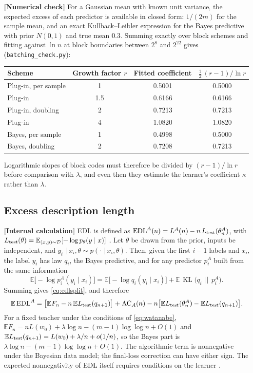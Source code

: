 \documentclass[11pt,a4paper]{article}
\newcommand{\E}{\mathbb E}
\newcommand{\KL}{\operatorname{KL}}
\newcommand{\EDL}{\mathrm{EDL}}
\newcommand{\evl}[2]{{\small\bfseries\color{#1}[#2]}}
\newcommand{\LCalc}{\evl{ccalc}{Internal calculation}}
\newcommand{\LNum}{\evl{cnum}{Numerical check}}
\begin{document}
\LNum{} For a Gaussian mean with known unit variance, the expected excess
of each predictor is available in closed form: $1/(2m)$ for the sample
mean, and an exact Kullback--Leibler expression for the Bayes predictive
with prior $N(0,1)$ and true mean $0.3$. Summing exactly over block
schemes and fitting against $\ln n$ at block boundaries between $2^8$ and
$2^{22}$ gives (\texttt{batching\_check.py}):

\begin{center}
\begin{tabular}{@{}lccc@{}}
\toprule
Scheme & Growth factor $r$ & Fitted coefficient & $\tfrac12\,(r-1)/\ln r$ \\
\midrule
Plug-in, per sample & 1 & 0.5001 & 0.5000 \\
Plug-in & 1.5 & 0.6166 & 0.6166 \\
Plug-in, doubling & 2 & 0.7213 & 0.7213 \\
Plug-in & 4 & 1.0820 & 1.0820 \\
Bayes, per sample & 1 & 0.4998 & 0.5000 \\
Bayes, doubling & 2 & 0.7208 & 0.7213 \\
\bottomrule
\end{tabular}
\end{center}

\noindent Logarithmic slopes of block codes must therefore be divided by
$(r-1)/\ln r$ before comparison with $\lambda$, and even then they estimate
the learner's coefficient $\kappa$ rather than $\lambda$.

\subsection{Excess description length}
\label{app:edl}

\LCalc{} EDL is defined as $\EDL^A(n)=L^A(n)-n\,L_{\rm test}(\theta^A_n)$,
with $L_{\rm test}(\theta)=\E_{(x,y)\sim\mathcal D}[-\log p_\theta(y\mid x)]$
\cite{donoway2026}. Let $\theta$ be drawn from the prior, inputs be
independent, and $y_i\mid x_i,\theta\sim p(\cdot\mid x_i,\theta)$. Then, given
the first $i-1$ labels and $x_i$, the label $y_i$ has law $q_i$, the Bayes
predictive, and for any predictor $p^A_i$ built from the same information
\begin{equation}
\E\bigl[-\log p^A_i(y_i\mid x_i)\bigr]
=\E\bigl[-\log q_i(y_i\mid x_i)\bigr]+\E\,\KL\bigl(q_i\,\|\,p^A_i\bigr).
\end{equation}
Summing gives \eqref{eq:edlsplit}, and therefore
\[
\E\,\EDL^A=\bigl[\E F_n-n\,\E L_{\rm test}(q_{n+1})\bigr]
+\mathrm{AC}_A(n)-n\bigl[\E L_{\rm test}(\theta^A_n)-\E L_{\rm test}(q_{n+1})\bigr].
\]
For a fixed teacher under the conditions of \eqref{eq:watanabe},
$\E F_n=nL(w_0)+\lambda\log n-(m-1)\log\log n+O(1)$ and
$\E L_{\rm test}(q_{n+1})=L(w_0)+\lambda/n+o(1/n)$, so the Bayes part is
$\lambda\log n-(m-1)\log\log n+O(1)$. The algorithmic term is nonnegative
under the Bayesian data model; the final-loss correction can have either
sign. The expected nonnegativity of EDL itself requires conditions on the
learner \cite{donoway2026}.
\end{document}
